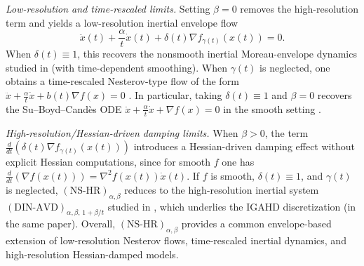 \documentclass[11pt]{article}
\numberwithin{equation}{section}
\begin{document}
\smallskip
\noindent
\emph{Low-resolution and time-rescaled limits.}
Setting $\beta=0$ removes the high-resolution term and yields a low-resolution inertial envelope flow \cite{BotKarapetyants2022}
\[
\ddot x(t)+\frac{\alpha}{t}\dot x(t)+\delta(t)\nabla f_{\gamma(t)}(x(t))=0.
\]
When $\delta(t)\equiv 1$, this recovers the nonsmooth inertial Moreau-envelope dynamics studied in
\cite{AttouchCabot2018JDE} (with time-dependent smoothing). When $\gamma(t)$ is neglected, one obtains a time-rescaled Nesterov-type flow of the form
$\ddot x+\frac{\alpha}{t}\dot x + b(t)\nabla f(x)=0$ \cite{AttouchRiahi2019}. In particular, taking $\delta(t)\equiv 1$ and $\beta=0$ recovers the Su--Boyd--Cand\`es ODE
$\ddot x + \frac{\alpha}{t}\dot x + \nabla f(x)=0$ in the smooth setting \cite{Su2016}.

\smallskip
\noindent
\emph{High-resolution/Hessian-driven damping limits.}
When $\beta>0$, the term $\frac{d}{dt}(\delta(t)\nabla f_{\gamma(t)}(x(t)))$ introduces a Hessian-driven damping
effect without explicit Hessian computations, since for smooth $f$ one has
$\frac{d}{dt}(\nabla f(x(t)))=\nabla^2 f(x(t))\dot x(t)$.
If $f$ is smooth, $\delta(t)\equiv 1$, and $\gamma(t)$ is neglected, $(\mathrm{NS\text{-}HR})_{\alpha,\beta}$ reduces to the
high-resolution inertial system $(\mathrm{DIN\text{-}AVD})_{\alpha,\beta,\,1+\beta/t}$ studied in \cite{AttouchChbani2022},
which underlies the IGAHD discretization (in the same paper). Overall, $(\mathrm{NS\text{-}HR})_{\alpha,\beta}$ provides a common envelope-based extension of low-resolution Nesterov flows,
time-rescaled inertial dynamics, and high-resolution Hessian-damped models.
\end{document}
